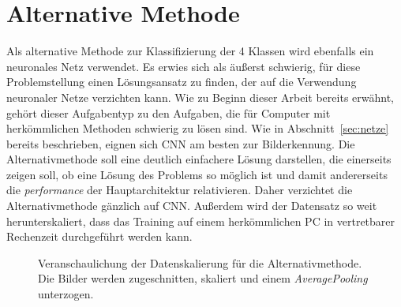 \chapter{Alternative Methode}

Als alternative Methode zur Klassifizierung der 4 Klassen wird ebenfalls ein
neuronales Netz verwendet. Es erwies sich als äußerst schwierig, für diese
Problemstellung einen Lösungsansatz zu finden, der auf die Verwendung
neuronaler Netze verzichten kann. Wie zu Beginn dieser Arbeit bereits erwähnt,
gehört dieser Aufgabentyp zu den Aufgaben, die für Computer mit herkömmlichen
Methoden schwierig zu lösen sind.
Wie in Abschnitt~\ref{sec:netze} bereits beschrieben, eignen sich CNN am besten
zur Bilderkennung. Die Alternativmethode soll eine deutlich einfachere Lösung
darstellen, die einerseits zeigen soll, ob eine Lösung des Problems so möglich
ist und damit andererseits die \textit{performance} der Hauptarchitektur
relativieren. Daher verzichtet die Alternativmethode gänzlich auf CNN.
Außerdem wird der Datensatz so weit herunterskaliert, dass das Training auf
einem herkömmlichen PC in vertretbarer Rechenzeit durchgeführt werden kann.
%
\begin{figure}[h!]
  \hspace{5pt}
  \caption{Veranschaulichung der Datenskalierung für die Alternativmethode. Die Bilder werden zugeschnitten, skaliert und einem \textit{AveragePooling} unterzogen.}
  \label{fig:alter}
\end{figure}
